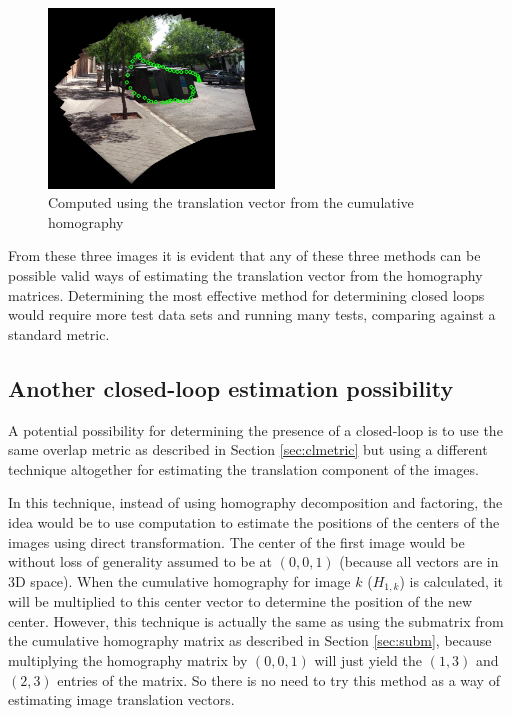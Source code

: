 \documentclass{article}
\begin{document}
\begin{figure}[ht!]
\centering
\includegraphics[width=6cm]{centers_imgs/test_set_15_t_from_h_all_YES/moswithtrans0049_edit.jpg}
\caption{Computed using the translation vector from the cumulative homography}
\end{figure}

From these three images it is evident that any of these three methods can be
possible valid ways of estimating the translation vector from the homography
matrices. Determining the most effective method for determining closed loops
would require more test data sets and running many tests, comparing against a
standard metric. 

\subsection{Another closed-loop estimation possibility}

A potential possibility for determining the presence of a closed-loop is to use
the same overlap metric as described in Section \ref{sec:clmetric} but using a
different technique altogether for estimating the translation component of the
images.

In this technique, instead of using homography decomposition and factoring, the
idea would be to use computation to estimate the positions of the centers of
the images using direct transformation. The center of the first image would be
without loss of generality assumed to be at $(0, 0, 1)$ (because all vectors
are in 3D space). When the cumulative homography for image $k$ ($H_{1, k}$) is
calculated, it will be multiplied to this center vector to determine the
position of the new center. However, this technique is actually the same as
using the submatrix from the cumulative homography matrix as described in
Section \ref{sec:subm}, because multiplying the homography matrix by $(0, 0,1)$ 
will just yield the $(1, 3)$ and $(2, 3)$ entries of the matrix. So there
is no need to try this method as a way of estimating image translation vectors.  
\end{document}
